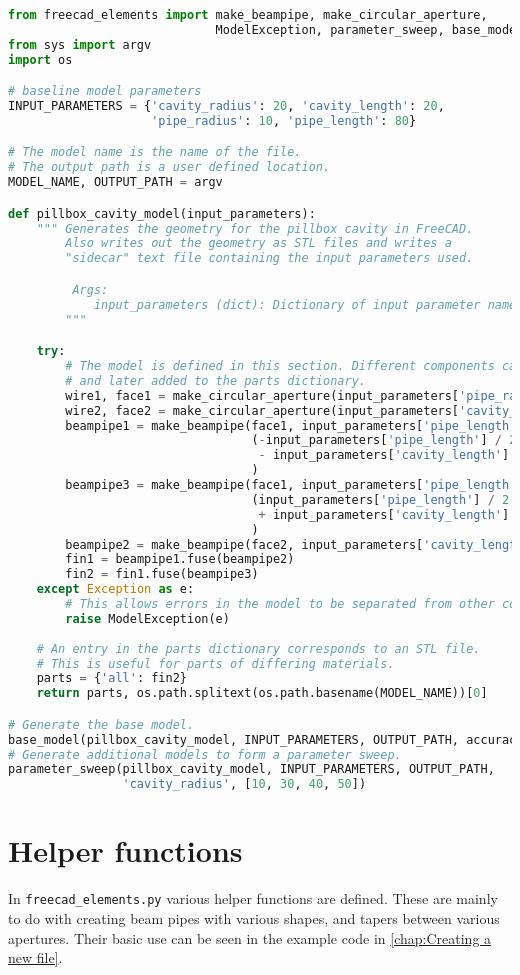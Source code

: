 \documentclass{report}
\begin{document}
\begin{lstlisting}[language=Python]
from freecad_elements import make_beampipe, make_circular_aperture, 
                             ModelException, parameter_sweep, base_model
from sys import argv
import os

# baseline model parameters
INPUT_PARAMETERS = {'cavity_radius': 20, 'cavity_length': 20,
                    'pipe_radius': 10, 'pipe_length': 80}

# The model name is the name of the file. 
# The output path is a user defined location.
MODEL_NAME, OUTPUT_PATH = argv

def pillbox_cavity_model(input_parameters):
    """ Generates the geometry for the pillbox cavity in FreeCAD. 
        Also writes out the geometry as STL files and writes a 
        "sidecar" text file containing the input parameters used.

         Args:
            input_parameters (dict): Dictionary of input parameter names and values
        """

    try:
        # The model is defined in this section. Different components can be defined 
        # and later added to the parts dictionary.
        wire1, face1 = make_circular_aperture(input_parameters['pipe_radius'])
        wire2, face2 = make_circular_aperture(input_parameters['cavity_radius'])
        beampipe1 = make_beampipe(face1, input_parameters['pipe_length'],
                                  (-input_parameters['pipe_length'] / 2. 
                                   - input_parameters['cavity_length'] / 2., 0, 0)
                                  )
        beampipe3 = make_beampipe(face1, input_parameters['pipe_length'],
                                  (input_parameters['pipe_length'] / 2. 
                                   + input_parameters['cavity_length'] / 2., 0, 0)
                                  )
        beampipe2 = make_beampipe(face2, input_parameters['cavity_length'])
        fin1 = beampipe1.fuse(beampipe2)
        fin2 = fin1.fuse(beampipe3)
    except Exception as e:
        # This allows errors in the model to be separated from other code errors.
        raise ModelException(e)
        
    # An entry in the parts dictionary corresponds to an STL file. 
    # This is useful for parts of differing materials.
    parts = {'all': fin2}
    return parts, os.path.splitext(os.path.basename(MODEL_NAME))[0]

# Generate the base model.
base_model(pillbox_cavity_model, INPUT_PARAMETERS, OUTPUT_PATH, accuracy=10)
# Generate additional models to form a parameter sweep.
parameter_sweep(pillbox_cavity_model, INPUT_PARAMETERS, OUTPUT_PATH, 
                'cavity_radius', [10, 30, 40, 50])
\end{lstlisting}

\chapter{Helper functions}
In \verb|freecad_elements.py| various helper functions are defined. These are mainly to do with creating beam pipes with various shapes, and tapers between various apertures. Their basic use can be seen in the example code in \autoref{chap:Creating a new file}.
\end{document}
